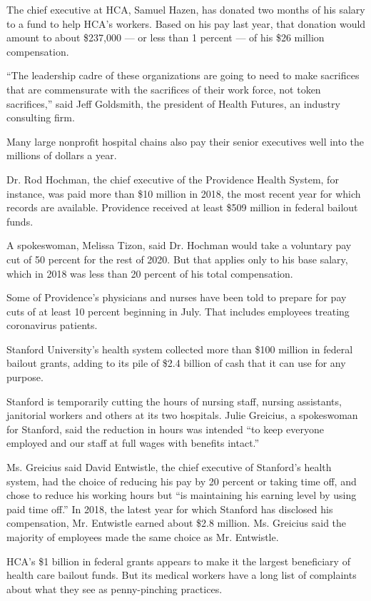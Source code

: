The chief executive at HCA, Samuel Hazen, has donated two months of his
salary to a fund to help HCA's workers. Based on his pay last year, that
donation would amount to about \$237,000 --- or less than 1 percent ---
of his \$26 million compensation.

``The leadership cadre of these organizations are going to need to make
sacrifices that are commensurate with the sacrifices of their work
force, not token sacrifices,'' said Jeff Goldsmith, the president of
Health Futures, an industry consulting firm.

Many large nonprofit hospital chains also pay their senior executives
well into the millions of dollars a year.

Dr. Rod Hochman, the chief executive of the Providence Health System,
for instance, was paid more than \$10 million in 2018, the most recent
year for which records are available. Providence received at least \$509
million in federal bailout funds.

A spokeswoman, Melissa Tizon, said Dr. Hochman would take a voluntary
pay cut of 50 percent for the rest of 2020. But that applies only to his
base salary, which in 2018 was less than 20 percent of his total
compensation.

Some of Providence's physicians and nurses have been told to prepare for
pay cuts of at least 10 percent beginning in July. That includes
employees treating coronavirus patients.

Stanford University's health system collected more than \$100 million in
federal bailout grants, adding to its pile of \$2.4 billion of cash that
it can use for any purpose.

Stanford is temporarily cutting the hours of nursing staff, nursing
assistants, janitorial workers and others at its two hospitals. Julie
Greicius, a spokeswoman for Stanford, said the reduction in hours was
intended ``to keep everyone employed and our staff at full wages with
benefits intact.''

Ms. Greicius said David Entwistle, the chief executive of Stanford's
health system, had the choice of reducing his pay by 20 percent or
taking time off, and chose to reduce his working hours but ``is
maintaining his earning level by using paid time off.'' In 2018, the
latest year for which Stanford has disclosed his compensation, Mr.
Entwistle earned about \$2.8 million. Ms. Greicius said the majority of
employees made the same choice as Mr. Entwistle.

HCA's \$1 billion in federal grants appears to make it the largest
beneficiary of health care bailout funds. But its medical workers have a
long list of complaints about what they see as penny-pinching practices.

